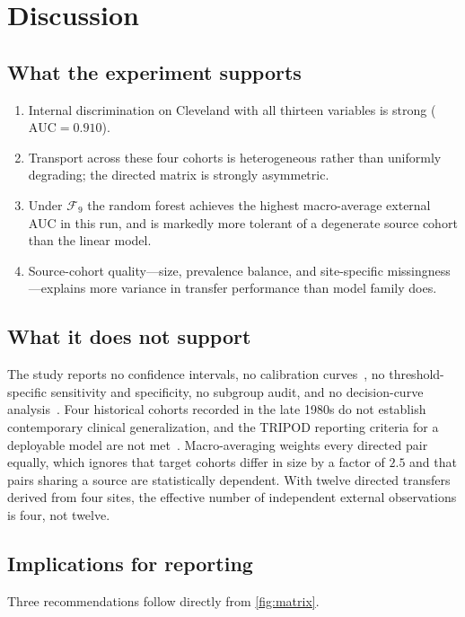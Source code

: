 \documentclass[manuscript,nonacm]{acmart}
\begin{document}
\section{Discussion}
\label{sec:discussion}

\subsection{What the experiment supports}
\begin{enumerate}
\item Internal discrimination on Cleveland with all thirteen variables is strong
      ($\mathrm{AUC}=0.910$).
\item Transport across these four cohorts is heterogeneous rather than uniformly
      degrading; the directed matrix is strongly asymmetric.
\item Under $\mathcal{F}_9$ the random forest achieves the highest macro-average
      external AUC in this run, and is markedly more tolerant of a degenerate source
      cohort than the linear model.
\item Source-cohort quality---size, prevalence balance, and site-specific
      missingness---explains more variance in transfer performance than model family
      does.
\end{enumerate}

\subsection{What it does not support}
The study reports no confidence intervals, no calibration
curves~\cite{vanCalster2019}, no threshold-specific sensitivity and specificity, no
subgroup audit, and no decision-curve analysis~\cite{vickers2006}. Four historical
cohorts recorded in the late 1980s do not establish contemporary clinical
generalization, and the TRIPOD reporting criteria for a deployable model are not
met~\cite{collins2015tripod}. Macro-averaging weights every directed pair equally,
which ignores that target cohorts differ in size by a factor of $2.5$ and that pairs
sharing a source are statistically dependent. With twelve directed transfers derived
from four sites, the effective number of independent external observations is four,
not twelve.

\subsection{Implications for reporting}
Three recommendations follow directly from \cref{fig:matrix}.
\end{document}
